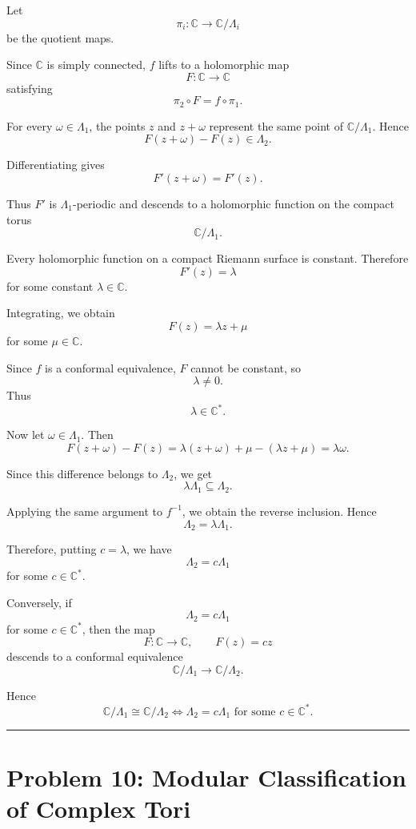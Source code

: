 \documentclass[12pt,a4paper]{article}
\theoremstyle{notespace}
\begin{document}
Let
\[
\pi_i:\mathbb C\to \mathbb C/\Lambda_i
\]
be the quotient maps.

Since \(\mathbb C\) is simply connected, \(f\) lifts to a holomorphic map
\[
F:\mathbb C\to\mathbb C
\]
satisfying
\[
\pi_2\circ F=f\circ \pi_1.
\]

For every \(\omega\in\Lambda_1\), the points \(z\) and \(z+\omega\)
represent the same point of \(\mathbb C/\Lambda_1\). Hence
\[
F(z+\omega)-F(z)\in\Lambda_2.
\]

Differentiating gives
\[
F'(z+\omega)=F'(z).
\]

Thus \(F'\) is \(\Lambda_1\)-periodic and descends to a holomorphic
function on the compact torus
\[
\mathbb C/\Lambda_1.
\]

Every holomorphic function on a compact Riemann surface is constant.
Therefore
\[
F'(z)=\lambda
\]
for some constant \(\lambda\in\mathbb C\).

Integrating, we obtain
\[
F(z)=\lambda z+\mu
\]
for some \(\mu\in\mathbb C\).

Since \(f\) is a conformal equivalence, \(F\) cannot be constant, so
\[
\lambda\neq 0.
\]
Thus
\[
\lambda\in\mathbb C^*.
\]

Now let \(\omega\in\Lambda_1\). Then
\[
F(z+\omega)-F(z)
=
\lambda(z+\omega)+\mu-(\lambda z+\mu)
=
\lambda\omega.
\]

Since this difference belongs to \(\Lambda_2\), we get
\[
\lambda\Lambda_1\subseteq \Lambda_2.
\]

Applying the same argument to \(f^{-1}\), we obtain the reverse
inclusion. Hence
\[
\Lambda_2=\lambda\Lambda_1.
\]

Therefore, putting \(c=\lambda\), we have
\[
\Lambda_2=c\Lambda_1
\]
for some \(c\in\mathbb C^*\).

Conversely, if
\[
\Lambda_2=c\Lambda_1
\]
for some \(c\in\mathbb C^*\), then the map
\[
F:\mathbb C\to\mathbb C,
\qquad
F(z)=cz
\]
descends to a conformal equivalence
\[
\mathbb C/\Lambda_1\longrightarrow \mathbb C/\Lambda_2.
\]

Hence
\[
\boxed{
	\mathbb C/\Lambda_1\cong \mathbb C/\Lambda_2
	\iff
	\Lambda_2=c\Lambda_1
	\text{ for some }c\in\mathbb C^*.
}
\]

\bigskip

\hrule

\bigskip

\section{Problem 10: Modular Classification of Complex Tori}
\end{document}
